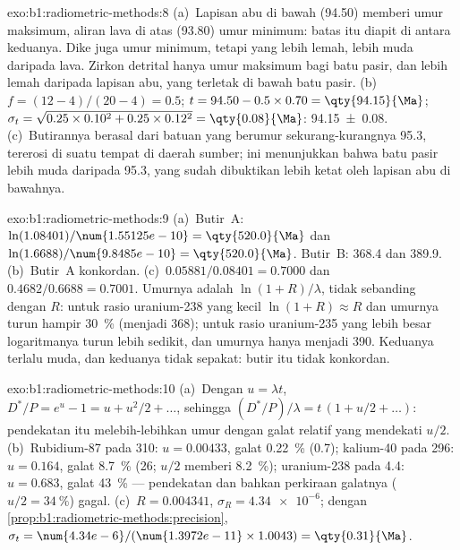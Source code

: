 \begin{solution}{exo:b1:radiometric-methods:8}
(a)~Lapisan abu di bawah (\qty{94.50}{\Ma}) memberi umur maksimum, aliran lava di atas
(\qty{93.80}{\Ma}) umur minimum: batas itu diapit di antara keduanya. Dike juga umur
minimum, tetapi yang lebih lemah, lebih muda daripada lava. Zirkon detrital hanya umur
maksimum bagi batu pasir, dan lebih lemah daripada lapisan abu, yang terletak di bawah
batu pasir. (b)~$f = (12 - 4)/(20 - 4) = 0.5$; $t = 94.50 - 0.5 \times 0.70 =
\qty{94.15}{\Ma}$; $\sigma_t = \sqrt{0.25 \times 0.10^2 + 0.25 \times 0.12^2} =
\qty{0.08}{\Ma}$: \qty[uncertainty-mode=separate]{94.15(8)}{\Ma}. (c)~Butirannya berasal
dari batuan yang berumur sekurang-kurangnya \qty{95.3}{\Ma}, tererosi di suatu tempat di
daerah sumber; ini menunjukkan bahwa batu pasir lebih muda daripada \qty{95.3}{\Ma}, yang
sudah dibuktikan lebih ketat oleh lapisan abu di bawahnya.
\end{solution}

\begin{solution}{exo:b1:radiometric-methods:9}
(a)~Butir~A: $\ln(1.08401)/\num{1.55125e-10} = \qty{520.0}{\Ma}$ dan
$\ln(1.6688)/\num{9.8485e-10} = \qty{520.0}{\Ma}$. Butir~B: \qty{368.4}{\Ma} dan
\qty{389.9}{\Ma}. (b)~Butir~A konkordan. (c)~$0.05881/0.08401 = 0.7000$ dan
$0.4682/0.6688 = 0.7001$. Umurnya adalah $\ln(1 + R)/\lambda$, tidak sebanding dengan
$R$: untuk rasio uranium-238 yang kecil $\ln(1+R) \approx R$ dan umurnya turun hampir
\qty{30}{\percent} (menjadi \qty{368}{\Ma}); untuk rasio uranium-235 yang lebih besar
logaritmanya turun lebih sedikit, dan umurnya hanya menjadi \qty{390}{\Ma}. Keduanya
terlalu muda, dan keduanya tidak sepakat: butir itu tidak konkordan.
\end{solution}

\begin{solution}{exo:b1:radiometric-methods:10}
(a)~Dengan $u = \lambda t$, $D^*/P = e^u - 1 = u + u^2/2 + \dots$, sehingga $(D^*/P)/\lambda
= t\,(1 + u/2 + \dots)$: pendekatan itu melebih-lebihkan umur dengan galat relatif yang
mendekati $u/2$. (b)~Rubidium-87 pada \qty{310}{\Ma}: $u = 0.00433$, galat
\qty{0.22}{\percent} (\qty{0.7}{\Ma}); kalium-40 pada \qty{296}{\Ma}: $u =
0.164$, galat \qty{8.7}{\percent} (\qty{26}{\Ma}; $u/2$ memberi \qty{8.2}{\percent});
uranium-238 pada \qty{4.4}{\Ga}: $u = 0.683$, galat \qty{43}{\percent} --- pendekatan dan
bahkan perkiraan galatnya ($u/2 = \qty{34}{\percent}$) gagal. (c)~$R = 0.004341$, $\sigma_R = \num{4.34e-6}$; dengan
\cref{prop:b1:radiometric-methods:precision}, $\sigma_t =
\num{4.34e-6}/(\num{1.3972e-11} \times 1.0043) = \qty{0.31}{\Ma}$.
\end{solution}

